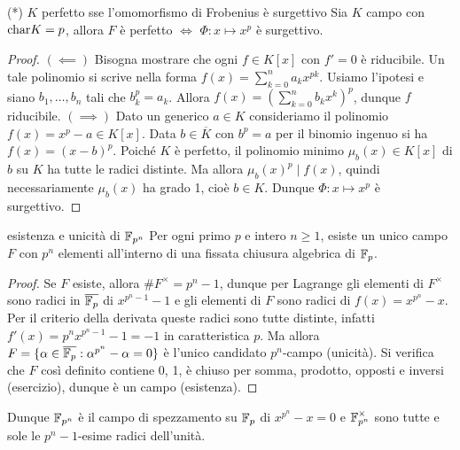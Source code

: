 \begin{theorem}{(*) $K$ perfetto sse l'omomorfismo di Frobenius è surgettivo}
    Sia $K$ campo con $\text{char} K = p$, allora $F$ è perfetto $\iff$ $\Phi: x \mapsto x^p$ è surgettivo.
\end{theorem}
\begin{proof}
    $(\impliedby)$ Bisogna mostrare che ogni $f \in K[x]$ con $f' = 0$ è riducibile. Un tale polinomio si scrive nella forma $f(x) = \sum_{k=0}^{n} a_k x^{pk}$. Usiamo l'ipotesi e siano $b_1, \dots, b_n$ tali che $b_k^p = a_k$. Allora $f(x) = (\sum_{k=0}^{n} b_k x^{k})^p$, dunque $f$ riducibile.
    $(\implies)$ Dato un generico $a \in K$ consideriamo il polinomio $f(x) = x^p - a \in K[x]$. Data $b \in \overline{K}$ con $b^p = a$ per il binomio ingenuo si ha $f(x) = (x - b)^p$. Poiché $K$ è perfetto, il polinomio minimo $\mu_b(x) \in K[x]$ di $b$ su $K$ ha tutte le radici distinte. Ma allora $\mu_b(x) ^ p \mid f(x)$, quindi necessariamente $\mu_b(x)$ ha grado 1, cioè $b \in K$. Dunque $\Phi : x \mapsto x^p$ è surgettivo.
\end{proof}

\begin{theorem}{esistenza e unicità di $\mathbb{F}_{p^n}$}
    Per ogni primo $p$ e intero $n \ge 1$, esiste un unico campo $F$ con $p^n$ elementi all'interno di una fissata chiusura algebrica di $\mathbb{F}_p$.
\end{theorem}
\begin{proof}
    Se $F$ esiste, allora $\#F^\times = p^n - 1$, dunque per Lagrange gli elementi di $F^\times$ sono radici in $\overline{\mathbb{F}_p}$ di $x^{p^n - 1} - 1$ e gli elementi di $F$ sono radici di $f(x) = x^{p^n} - x$. Per il criterio della derivata queste radici sono tutte distinte, infatti $f'(x) = p^n x^{p^n - 1} - 1 = -1$ in caratteristica $p$. Ma allora $F = \{ \alpha \in \overline{\mathbb{F}_p} : \alpha^{p^n} - \alpha = 0 \}$ è l'unico candidato $p^n$-campo (unicità). Si verifica che $F$ così definito contiene 0, 1, è chiuso per somma, prodotto, opposti e inversi (esercizio), dunque è un campo (esistenza).
\end{proof}

Dunque $\mathbb{F}_{p^n}$ è il campo di spezzamento su $\mathbb{F}_p$ di $x^{p^n} - x = 0$ e $\mathbb{F}_{p^n}^\times$ sono tutte e sole le $p^n-1$-esime radici dell'unità.

